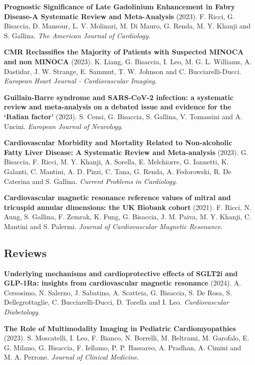 \documentclass[
  letterpaper,
  DIV=11,
  numbers=noendperiod]{scrartcl}
\begin{document}
\textbf{Prognostic Significance of Late Gadolinium Enhancement in Fabry
Disease-A Systematic Review and Meta-Analysis} (2023). F. Ricci, G.
Bisaccia, D. Mansour, L. V. Molinari, M. Di Mauro, G. Renda, M. Y.
Khanji and S. Gallina. \emph{The American Journal of Cardiology}.
\href{https://doi.org/10.1016/j.amjcard.2023.06.059}{}

\textbf{CMR Reclassifies the Majority of Patients with Suspected MINOCA
and non MINOCA} (2023). K. Liang, G. Bisaccia, I. Leo, M. G. L.
Williams, A. Dastidar, J. W. Strange, E. Sammut, T. W. Johnson and C.
Bucciarelli-Ducci. \emph{European Heart Journal - Cardiovascular
Imaging}. \href{https://doi.org/10.1093/ehjci/jead182}{}

\textbf{Guillain-Barre syndrome and SARS-CoV-2 infection: a systematic
review and meta-analysis on a debated issue and evidence for the
`Italian factor'} (2023). S. Censi, G. Bisaccia, S. Gallina, V.
Tomassini and A. Uncini. \emph{European Journal of Neurology}.
\href{https://doi.org/10.1111/ene.16094}{}

\textbf{Cardiovascular Morbidity and Mortality Related to Non-alcoholic
Fatty Liver Disease: A Systematic Review and Meta-analysis} (2023). G.
Bisaccia, F. Ricci, M. Y. Khanji, A. Sorella, E. Melchiorre, G.
Iannetti, K. Galanti, C. Mantini, A. D. Pizzi, C. Tana, G. Renda, A.
Fedorowski, R. De Caterina and S. Gallina. \emph{Current Problems in
Cardiology}. \href{https://doi.org/10.1016/j.cpcardiol.2023.101643}{}

\textbf{Cardiovascular magnetic resonance reference values of mitral and
tricuspid annular dimensions: the UK Biobank cohort} (2021). F. Ricci,
N. Aung, S. Gallina, F. Zemrak, K. Fung, G. Bisaccia, J. M. Paiva, M. Y.
Khanji, C. Mantini and S. Palermi. \emph{Journal of Cardiovascular
Magnetic Resonance}. \href{https://doi.org/10.1186/s12968-020-00688-y}{}

\subsection{Reviews}\label{reviews}

\textbf{Underlying mechanisms and cardioprotective effects of SGLT2i and
GLP-1Ra: insights from cardiovascular magnetic resonance} (2024). A.
Cersosimo, N. Salerno, J. Sabatino, A. Scatteia, G. Bisaccia, S. De
Rosa, S. Dellegrottaglie, C. Bucciarelli-Ducci, D. Torella and I. Leo.
\emph{Cardiovascular Diabetology}.
\href{https://doi.org/10.1186/s12933-024-02181-7}{}

\textbf{The Role of Multimodality Imaging in Pediatric Cardiomyopathies}
(2023). S. Moscatelli, I. Leo, F. Bianco, N. Borrelli, M. Beltrami, M.
Garofalo, E. G. Milano, G. Bisaccia, F. Iellamo, P. P. Bassareo, A.
Pradhan, A. Cimini and M. A. Perrone. \emph{Journal of Clinical
Medicine}. \href{https://doi.org/10.3390/jcm12144866}{}
\end{document}
